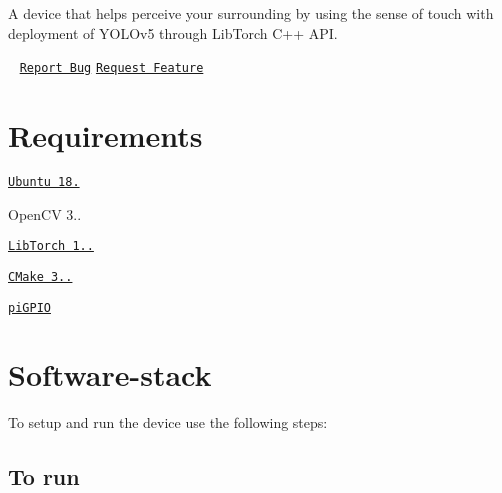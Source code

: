 A device that helps perceive your surrounding by using the sense of touch with deployment of Y\+O\+L\+Ov5 through Lib\+Torch C++ A\+PI.



   \href{https://github.com/Haptic-Vision/haptic_vision/blob/main/LICENSE}{\tt } ~\newline
 \href{https://github.com/MataPOS/matapos/issues}{\tt Report Bug} \href{https://github.com/MataPOS/matapos/issues}{\tt Request Feature} ~\newline


 

\section*{Requirements}


\begin{DoxyItemize}
\item \href{https://www.instructables.com/Install-Ubuntu-18044-LTS-on-Your-Raspberry-Pi-Boar/}{\tt Ubuntu 18.}
\item Open\+CV 3..
\item \href{https://download.pytorch.org/libtorch/nightly/cpu/libtorch-shared-with-deps-latest.zip}{\tt Lib\+Torch 1..}
\item \href{https://askubuntu.com/questions/355565/how-do-i-install-the-latest-version-of-cmake-from-the-command-line}{\tt C\+Make 3..}
\item \href{https://abyz.me.uk/rpi/pigpio/download.html}{\tt pi\+G\+P\+IO}
\end{DoxyItemize}

\section*{Software-\/stack}

To setup and run the device use the following steps\+:



\subsection*{To run}


